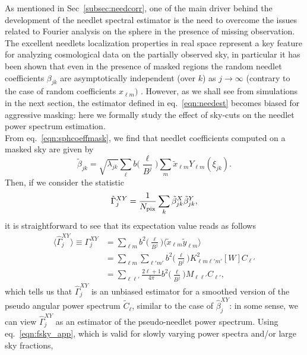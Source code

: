 \documentclass[a4paper,11pt]{article}
\begin{document}
As mentioned in Sec~\ref{subsec:needcorr}, one of the main driver behind the development of the needlet spectral estimator is 
the need to overcome the issues related to Fourier analysis on the sphere in the presence of missing observation.
The excellent needlets localization properties in real space represent a key feature for analyzing cosmological data on the 
partially observed sky, in particular it has been shown that even in the presence of masked regions the random needlet coefficients 
$\beta_{jk}$ are asymptotically independent (over $k$) as $j \to \infty$ (contrary to the case of random coefficients $x_{\ell m})$ 
\citep{Marinucci2007, Baldi2009a}. However, as we shall see from simulations in the next section, the estimator defined in eq.~\ref{eqn:needest}
becomes biased for aggressive masking: here we formally study the effect of sky-cuts on the needlet power spectrum estimation.\\ 
From eq.~\ref{eqn:sphcoeffmask}, we find that needlet coefficients computed on a masked sky are given by
%
\begin{equation}
\label{eqn:needcoefmask}
\tilde{\beta}_{jk} = \sqrt{\lambda_{jk}} \sum_{\ell} b\biggl(\frac{\ell}{B^{j}}\biggr)\sum_{m}\tilde{x}_{\ell m}Y_{\ell m}(\xi_{jk}).
\end{equation}
%
Then, if we consider the statistic 
%
\begin{equation}
\label{eqn:gammaest}
\hat{\Gamma}^{XY}_j = \frac{1}{N_{\rm pix}} \sum_k \tilde{\beta}^X_{jk} \tilde{\beta}^Y_{jk},
\end{equation}
%
it is straightforward to see that its expectation value reads as follows
%
\begin{equation}
\label{eqn:gammaestmean}
\begin{split}
\langle \hat{\Gamma}^{XY}_j \rangle \equiv {\Gamma}^{XY}_j &= \sum_{\ell m} b^2\biggl(\frac{\ell}{B^{j}}\biggr) \langle \tilde{x}_{\ell m}\tilde{y}_{\ell m} \rangle \\
&= \sum_{\ell m} \sum_{\ell' m'} b^2\biggl(\frac{\ell}{B^{j}}\biggr) K^2_{\ell m \ell' m'}[W] C_{\ell'}\\
&= \sum_{\ell\ell'} \frac{2\ell+1}{{4\pi}} b^2\biggl(\frac{\ell}{B^{j}}\biggr) M_{\ell\ell'}C_{\ell'},
\end{split}
\end{equation}
%
which tells us that $\hat{\Gamma}^{XY}_j $ is an unbiased estimator for a smoothed version of the pseudo angular power spectrum $\tilde{C}_{\ell}$,
similar to the case of $\hat{\beta}^{XY}_j$: in some sense, we can view $\hat{\Gamma}^{XY}_j $ as an estimator of the pseudo-needlet power spectrum. Using eq.~\ref{eqn:fsky_app}, which is valid for slowly varying power spectra and/or large sky fractions,
\end{document}
